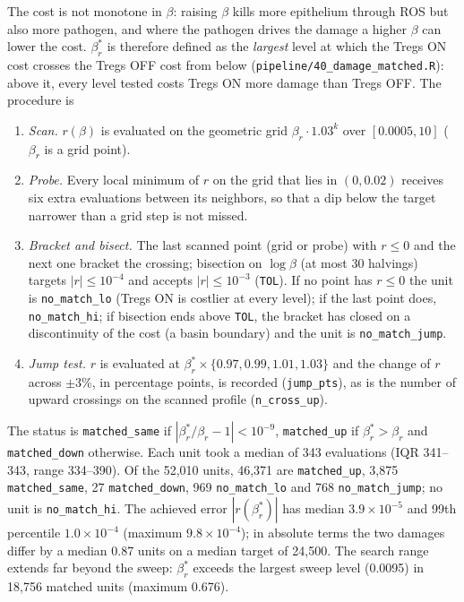 \documentclass[11pt]{article}
\begin{document}
The cost is not monotone in $\beta$: raising $\beta$ kills more epithelium through ROS but also
more pathogen, and where the pathogen drives the damage a higher $\beta$ can lower the cost.
$\beta_r^{*}$ is therefore defined as the \emph{largest} level at which the Tregs ON cost
crosses the Tregs OFF cost from below (\texttt{pipeline/40\_damage\_matched.R}): above it, every level tested costs Tregs ON more
damage than Tregs OFF. The procedure is
\begin{enumerate}
\item \emph{Scan.} $r(\beta)$ is evaluated on the geometric grid $\beta_r \cdot 1.03^k$ over
  $[0.0005, 10]$ ($\beta_r$ is a grid point).
\item \emph{Probe.} Every local minimum of $r$ on the grid that lies in $(0, 0.02)$
  receives six extra evaluations between its neighbors, so that a dip below the target
  narrower than a grid step is not missed.
\item \emph{Bracket and bisect.} The last scanned point (grid or probe) with $r \le 0$ and the next one bracket the
  crossing; bisection on $\log\beta$ (at most 30 halvings) targets $|r| \le 10^{-4}$ and accepts
  $|r| \le 10^{-3}$ (\texttt{TOL}). If no point has $r \le 0$ the unit is \texttt{no\_match\_lo}
  (Tregs ON is costlier at every level); if the last point does, \texttt{no\_match\_hi}; if
  bisection ends above \texttt{TOL}, the bracket has closed on a discontinuity of the cost (a
  basin boundary) and the unit is \texttt{no\_match\_jump}.
\item \emph{Jump test.} $r$ is evaluated at $\beta_r^{*} \times \{0.97, 0.99, 1.01, 1.03\}$ and the
  change of $r$ across $\pm 3\%$, in percentage points, is recorded (\texttt{jump\_pts}), as is
  the number of upward crossings on the scanned profile (\texttt{n\_cross\_up}).
\end{enumerate}
The status is \texttt{matched\_same} if $|\beta_r^{*}/\beta_r - 1| < 10^{-9}$, \texttt{matched\_up} if
$\beta_r^{*} > \beta_r$ and \texttt{matched\_down} otherwise. Each unit took a median of 343 evaluations (IQR 341--343, range 334--390). Of the 52{,}010 units, 46{,}371 are \texttt{matched\_up}, 3{,}875 \texttt{matched\_same},
27 \texttt{matched\_down}, 969 \texttt{no\_match\_lo} and 768 \texttt{no\_match\_jump}; no unit is
\texttt{no\_match\_hi}. The achieved error $|r(\beta_r^{*})|$ has median $3.9\times10^{-5}$ and
99th percentile $1.0\times10^{-4}$ (maximum $9.8\times10^{-4}$); in absolute terms the two
damages differ by a median 0.87 units on a median target of 24{,}500. The search range
extends far beyond the sweep: $\beta_r^{*}$ exceeds the largest sweep level (0.0095) in 18{,}756
matched units (maximum 0.676).
\end{document}
